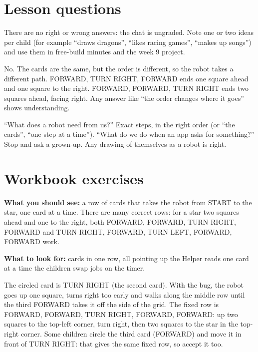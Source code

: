 
\section{Lesson questions}
\begin{answer}
There are no right or wrong answers: the chat is ungraded. Note one or two ideas per child (for example \enquote{draws dragons}, \enquote{likes racing games}, \enquote{makes up songs}) and use them in free-build minutes and the week 9 project.
\end{answer}

\begin{answer}
No. The cards are the same, but the order is different, so the robot takes a different path. FORWARD, TURN RIGHT, FORWARD ends one square ahead and one square to the right. FORWARD, FORWARD, TURN RIGHT ends two squares ahead, facing right. Any answer like \enquote{the order changes where it goes} shows understanding.
\end{answer}

\begin{answer}[Reflection]
\enquote{What does a robot need from us?} Exact steps, in the right order (or \enquote{the cards}, \enquote{one step at a time}). \enquote{What do we do when an app asks for something?} Stop and ask a grown-up. Any drawing of themselves as a robot is right.
\end{answer}

\section{Workbook exercises}
\begin{answer}
\textbf{What you should see:} a row of cards that takes the robot from START to the star, one card at a time. There are many correct rows: for a star two squares ahead and one to the right, both FORWARD, FORWARD, TURN RIGHT, FORWARD and TURN RIGHT, FORWARD, TURN LEFT, FORWARD, FORWARD work.

\textbf{What to look for:} \tickbox{} cards in one row, all pointing up \quad \tickbox{} the Helper reads one card at a time \quad \tickbox{} the children swap jobs on the timer.
\end{answer}

\begin{answer}
The circled card is TURN RIGHT (the second card). With the bug, the robot goes up one square, turns right too early and walks along the middle row until the third FORWARD takes it off the side of the grid. The fixed row is FORWARD, FORWARD, TURN RIGHT, FORWARD, FORWARD: up two squares to the top-left corner, turn right, then two squares to the star in the top-right corner. Some children circle the third card (FORWARD) and move it in front of TURN RIGHT: that gives the same fixed row, so accept it too.
\end{answer}

